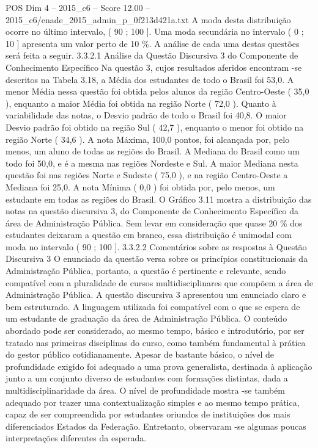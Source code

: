 \begin{textsample}{POS Dim 4 – 2015\_c6 – Score 12.00 – 2015\_c6/enade\_2015\_admin\_p\_0f213d421a.txt}
A moda desta distribuição ocorre no último intervalo, ( 90 ; 100 ].
Uma moda secundária no intervalo ( 0 ; 10 ] apresenta um valor perto de 10 \%.
A análise de cada uma destas questões será feita a seguir. 3.3.2.1 Análise da Questão Discursiva 3 do Componente de Conhecimento Específico Na questão 3, cujos resultados aferidos encontram -se descritos na Tabela 3.18, a Média dos estudantes de todo o Brasil foi 53,0.
A menor Média nessa questão foi obtida pelos alunos da região Centro-Oeste ( 35,0 ), enquanto a maior Média foi obtida na região Norte ( 72,0 ).
Quanto à variabilidade das notas, o Desvio padrão de todo o Brasil foi 40,8.
O maior Desvio padrão foi obtido na região Sul ( 42,7 ), enquanto o menor foi obtido na região Norte ( 34,6 ).
A nota Máxima, 100,0 pontos, foi alcançada por, pelo menos, um aluno de todas as regiões do Brasil.
A Mediana do Brasil como um todo foi 50,0, e é a mesma nas regiões Nordeste e Sul.
A maior Mediana nesta questão foi nas regiões Norte e Sudeste ( 75,0 ), e na região Centro-Oeste a Mediana foi 25,0.
A nota Mínima ( 0,0 ) foi obtida por, pelo menos, um estudante em todas as regiões do Brasil.
O Gráfico 3.11 mostra a distribuição das notas na questão discursiva 3, do Componente de Conhecimento Específico da área de Administração Pública.
Sem levar em consideração que quase 20 \% dos estudantes deixaram a questão em branco, essa distribuição é unimodal com moda no intervalo ( 90 ; 100 ]. 3.3.2.2 Comentários sobre as respostas à Questão Discursiva 3 O enunciado da questão versa sobre os princípios constitucionais da Administração Pública, portanto, a questão é pertinente e relevante, sendo compatível com a pluralidade de cursos multidisciplinares que compõem a área de Administração Pública.
A questão discursiva 3 apresentou um enunciado claro e bem estruturado.
A linguagem utilizada foi compatível com o que se espera de um estudante de graduação da área de Administração Pública.
O conteúdo abordado pode ser considerado, ao mesmo tempo, básico e introdutório, por ser tratado nas primeiras disciplinas do curso, como também fundamental à prática do gestor público cotidianamente.
Apesar de bastante básico, o nível de profundidade exigido foi adequado a uma prova generalista, destinada à aplicação junto a um conjunto diverso de estudantes com formações distintas, dada a multidisciplinaridade da área.
O nível de profundidade mostra -se também adequado por trazer uma contextualização simples e ao mesmo tempo prática, capaz de ser compreendida por estudantes oriundos de instituições dos mais diferenciados Estados da Federação.
Entretanto, observaram -se algumas poucas interpretações diferentes da esperada.

\end{textsample}
